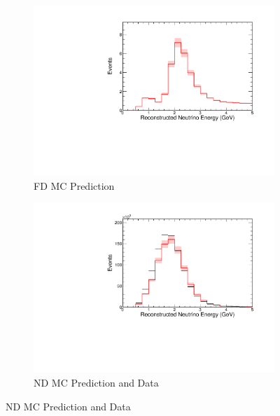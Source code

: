 {\begin{figure}
\end{figure}


\begin{figure}
\begin{center}
\begin{subfigure}[c]{0.49\textwidth}
\includegraphics[width=\textwidth]{figures/systs/prediction/fd_mc_prediction_numuSumSmallGENIE.pdf}
\caption*{FD MC Prediction}
\end{subfigure}
\begin{subfigure}[c]{0.49\textwidth}
\includegraphics[width=\textwidth]{figures/systs/prediction/nd_mc_prediction_numuSumSmallGENIE.pdf}
\caption*{ND MC Prediction and Data}
\end{subfigure}

\vspace{20pt}


\end{center}
\end{figure}}

